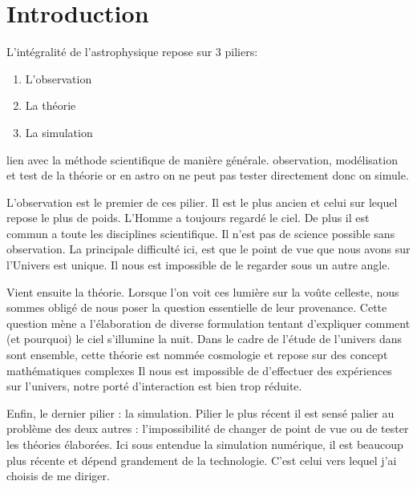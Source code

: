 \chapter{Introduction}

L'intégralité de l'astrophysique repose sur 3 piliers:
\begin{enumerate}
\item L'observation
\item La théorie
\item La simulation
\end{enumerate}

lien avec la méthode scientifique de manière générale. 
observation, modélisation et test de la théorie or en astro on ne peut pas tester directement donc on simule.

L'observation est le premier de ces pilier. 
Il est le plus ancien et celui sur lequel repose le plus de poids.
L'Homme a toujours regardé le ciel.
De plus il est commun a toute les disciplines scientifique.
Il n'est pas de science possible sans observation.
La principale difficulté ici, est que le point de vue que nous avons sur l'Univers est unique. 
Il nous est impossible de le regarder sous un autre angle.

Vient ensuite la théorie.
Lorsque l'on voit ces lumière sur la voûte celleste, nous sommes obligé de nous poser la question essentielle de leur provenance.
Cette question mène a l'élaboration de diverse formulation tentant d'expliquer comment (et pourquoi) le ciel s'illumine la nuit.  
Dans le cadre de l'étude de l'univers dans sont ensemble, cette théorie est nommée cosmologie et repose sur des concept mathématiques complexes
Il nous est impossible de d'effectuer des expériences sur l'univers, notre porté d'interaction est bien trop réduite.

Enfin, le dernier pilier : la simulation.
Pilier le plus récent il est sensé palier au problème des deux autres : l'impossibilité de changer de point de vue ou de tester les théories élaborées.
Ici sous entendue la simulation numérique, il est beaucoup plus récente et dépend grandement de la technologie.
C'est celui vers lequel j'ai choisis de me diriger.


